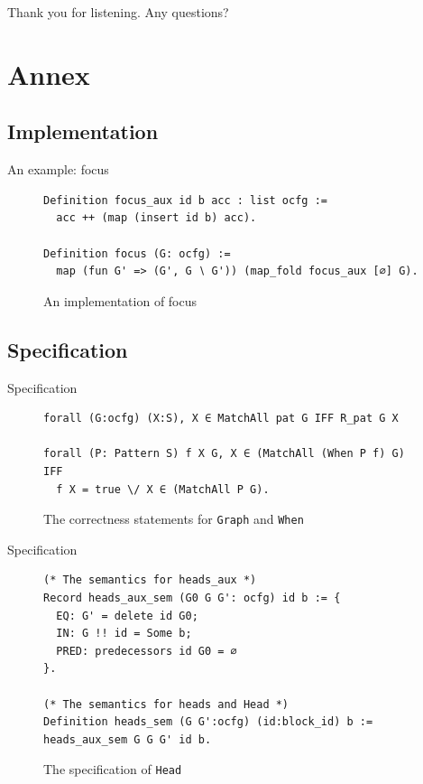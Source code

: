 \documentclass{beamer}
\newcommand{\inlinecoq}[1]{\mbox{\lstinline[style=customcoq,columns=fixed,basewidth=.48em]{#1}}}
\newcommand{\ilc}[1]{\inlinecoq{#1}}
\begin{document}
\begin{frame}{Thank you for listening.}
  Any questions?
\end{frame}

\section*{Annex}

\subsection*{Implementation}

\begin{frame}{An example: focus}
  \begin{figure}
    \begin{lstlisting}[style=customcoq,basicstyle=\small\ttfamily]
Definition focus_aux id b acc : list ocfg :=
  acc ++ (map (insert id b) acc).

Definition focus (G: ocfg) :=
  map (fun G' => (G', G ∖ G')) (map_fold focus_aux [∅] G).
  \end{lstlisting}
    \caption{An implementation of focus}
  \end{figure}
\end{frame}

\subsection*{Specification}

\begin{frame}{Specification}
  \begin{figure}
    \begin{lstlisting}[style=customcoq,basicstyle=\small\ttfamily]
forall (G:ocfg) (X:S), X ∈ MatchAll pat G IFF R_pat G X

forall (P: Pattern S) f X G, X ∈ (MatchAll (When P f) G) IFF
  f X = true \/ X ∈ (MatchAll P G).
  \end{lstlisting}
    \caption{The correctness statements for \ilc{Graph} and \ilc{When}}
  \end{figure}
\end{frame}

\begin{frame}{Specification}
  \begin{figure}
    \begin{lstlisting}[style=customcoq,basicstyle=\small\ttfamily]
(* The semantics for heads_aux *)
Record heads_aux_sem (G0 G G': ocfg) id b := {
  EQ: G' = delete id G0;
  IN: G !! id = Some b;
  PRED: predecessors id G0 = ∅
}.

(* The semantics for heads and Head *)
Definition heads_sem (G G':ocfg) (id:block_id) b := heads_aux_sem G G G' id b.
    \end{lstlisting}
    \caption{The specification of \ilc{Head}}
    \label{fig:sem_head_def}
  \end{figure}
\end{frame}
\end{document}
